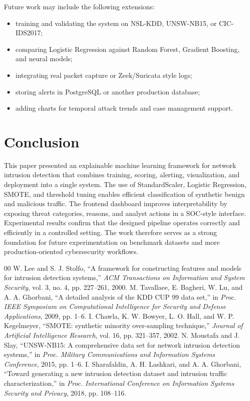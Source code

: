\documentclass[conference]{IEEEtran}
\begin{document}
Future work may include the following extensions:
\begin{itemize}
\item training and validating the system on NSL-KDD, UNSW-NB15, or CIC-IDS2017;
\item comparing Logistic Regression against Random Forest, Gradient Boosting, and neural models;
\item integrating real packet capture or Zeek/Suricata style logs;
\item storing alerts in PostgreSQL or another production database;
\item adding charts for temporal attack trends and case management support.
\end{itemize}

\section{Conclusion}
This paper presented an explainable machine learning framework for network intrusion detection that combines training, scoring, alerting, visualization, and deployment into a single system. The use of StandardScaler, Logistic Regression, SMOTE, and threshold tuning enables efficient classification of synthetic benign and malicious traffic. The frontend dashboard improves interpretability by exposing threat categories, reasons, and analyst actions in a SOC-style interface. Experimental results confirm that the designed pipeline operates correctly and efficiently in a controlled setting. The work therefore serves as a strong foundation for future experimentation on benchmark datasets and more production-oriented cybersecurity workflows.

\begin{thebibliography}{00}
 W. Lee and S. J. Stolfo, ``A framework for constructing features and models for intrusion detection systems,'' \emph{ACM Transactions on Information and System Security}, vol. 3, no. 4, pp. 227--261, 2000.
 M. Tavallaee, E. Bagheri, W. Lu, and A. A. Ghorbani, ``A detailed analysis of the KDD CUP 99 data set,'' in \emph{Proc. IEEE Symposium on Computational Intelligence for Security and Defense Applications}, 2009, pp. 1--6.
 I. Chawla, K. W. Bowyer, L. O. Hall, and W. P. Kegelmeyer, ``SMOTE: synthetic minority over-sampling technique,'' \emph{Journal of Artificial Intelligence Research}, vol. 16, pp. 321--357, 2002.
 N. Moustafa and J. Slay, ``UNSW-NB15: A comprehensive data set for network intrusion detection systems,'' in \emph{Proc. Military Communications and Information Systems Conference}, 2015, pp. 1--6.
 I. Sharafaldin, A. H. Lashkari, and A. A. Ghorbani, ``Toward generating a new intrusion detection dataset and intrusion traffic characterization,'' in \emph{Proc. International Conference on Information Systems Security and Privacy}, 2018, pp. 108--116.
\end{thebibliography}
\end{document}
